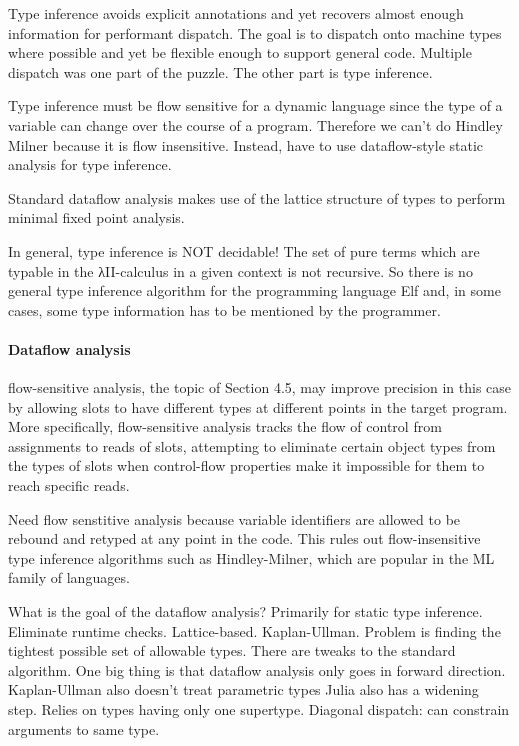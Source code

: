 \documentclass[pldi]{sigplanconf-pldi15}
\begin{document}
Type inference avoids explicit annotations and yet recovers almost enough information for performant dispatch. The goal is to dispatch onto machine types where possible and yet be flexible enough to support general code. Multiple dispatch was one part of the puzzle. The other part is type inference.

Type inference must be flow sensitive for a dynamic language since the type of a variable can change over the course of a program. Therefore we can't do Hindley Milner because it is flow insensitive. Instead, have to use dataflow-style static analysis for type inference.

Standard dataflow analysis makes use of the lattice structure of types to perform minimal fixed point analysis.

In general, type inference is NOT decidable! The set of pure terms which are typable in the λII-calculus in a given context is not recursive. So there is no general type inference algorithm for the programming language Elf and, in some cases, some type information has to be mentioned by the programmer. 

\paragraph{Dataflow analysis}
 flow-sensitive analysis, the topic of Section 4.5,
may improve precision in this case by allowing slots to have different types at different points in the target program.
More specifically, flow-sensitive analysis tracks the flow of control from assignments to reads of slots, attempting to
eliminate certain object types from the types of slots when control-flow properties make it impossible for them to
reach specific reads.

Need flow senstitive analysis because variable identifiers are allowed to be rebound and retyped at any point in the code. This rules out flow-insensitive type inference algorithms such as Hindley-Milner, which are popular in the ML family of languages.

What is the goal of the dataflow analysis? Primarily for static type inference. Eliminate runtime checks. Lattice-based. Kaplan-Ullman.
Problem is finding the tightest possible set of allowable types.
There are tweaks to the standard algorithm. One big thing is that dataflow analysis only goes in forward direction.
Kaplan-Ullman also doesn't treat parametric types
Julia also has a widening step.
Relies on types having only one supertype.
Diagonal dispatch: can constrain arguments to same type.
\end{document}
